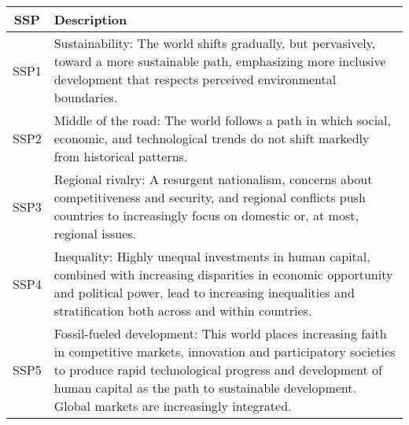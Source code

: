 \documentclass[honours,12pt]{unswthesis}
\numberwithin{equation}{section}
\begin{document}
\begin{table}[h]
    \begin{tabularx}{\textwidth}{|c|X|}
        \hline
        \textbf{SSP} & \textbf{Description}                                                                                                                                                                                                                                                                      \\ \hline
        SSP1         & Sustainability: The world shifts gradually, but pervasively, toward a more sustainable path, emphasizing more inclusive development that respects perceived environmental boundaries.                                                                                                     \\ \hline
        SSP2         & Middle of the road: The world follows a path in which social, economic, and technological trends do not shift markedly from historical patterns.                                                                                                                                          \\ \hline
        SSP3         & Regional rivalry: A resurgent nationalism, concerns about competitiveness and security, and regional conflicts push countries to increasingly focus on domestic or, at most, regional issues.                                                                                             \\ \hline
        SSP4         & Inequality: Highly unequal investments in human capital, combined with increasing disparities in economic opportunity and political power, lead to increasing inequalities and stratification both across and within countries.                                                           \\ \hline
        SSP5         & Fossil-fueled development: This world places increasing faith in competitive markets, innovation and participatory societies to produce rapid technological progress and development of human capital as the path to sustainable development. Global markets are increasingly integrated. \\ \hline    \end{tabularx}
\end{table}
    
\end{document}
